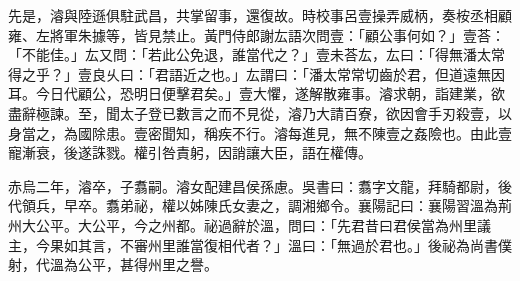 \begin{pinyinscope}
先是，濬與陸遜俱駐武昌，共掌留事，還復故。時校事呂壹操弄威柄，奏桉丞相顧雍、左將軍朱據等，皆見禁止。黃門侍郎謝厷語次問壹：「顧公事何如？」壹荅：「不能佳。」厷又問：「若此公免退，誰當代之？」壹未荅厷，厷曰：「得無潘太常得之乎？」壹良乆曰：「君語近之也。」厷謂曰：「潘太常常切齒於君，但道遠無因耳。今日代顧公，恐明日便擊君矣。」壹大懼，遂解散雍事。濬求朝，詣建業，欲盡辭極諫。至，聞太子登已數言之而不見從，濬乃大請百寮，欲因會手刃殺壹，以身當之，為國除患。壹密聞知，稱疾不行。濬每進見，無不陳壹之姦險也。由此壹寵漸衰，後遂誅戮。權引咎責躬，因誚讓大臣，語在權傳。

赤烏二年，濬卒，子翥嗣。濬女配建昌侯孫慮。吳書曰：翥字文龍，拜騎都尉，後代領兵，早卒。翥弟祕，權以姊陳氏女妻之，調湘鄉令。襄陽記曰：襄陽習溫為荊州大公平。大公平，今之州都。祕過辭於溫，問曰：「先君昔曰君侯當為州里議主，今果如其言，不審州里誰當復相代者？」溫曰：「無過於君也。」後祕為尚書僕射，代溫為公平，甚得州里之譽。


\end{pinyinscope}
